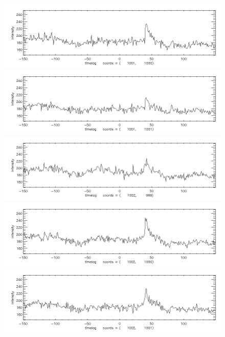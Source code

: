 \documentclass[12pt]{article}
\begin{document}
\begin{figure}[here]
\includegraphics[width=7in]{lc21.png}
\includegraphics[width=7in]{lc22.png}
\includegraphics[width=7in]{lc23.png}
\includegraphics[width=7in]{lc24.png}
\includegraphics[width=7in]{lc25.png}
\end{figure}
\newpage
\end{document}
